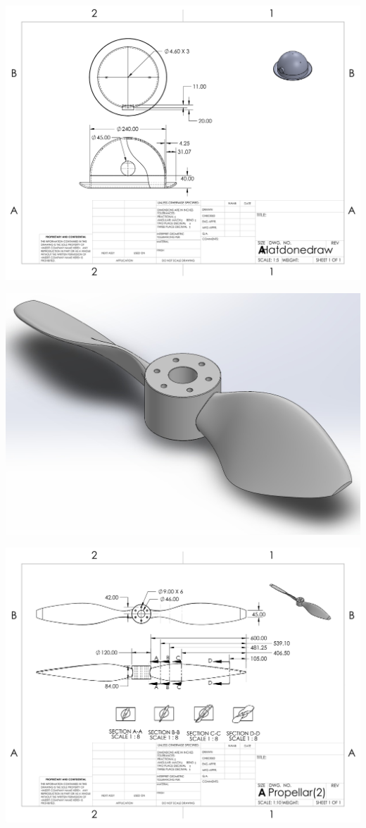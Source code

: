 \centering
\includegraphics[width=\linewidth]{root/Appendix_B/Hat_Body.pdf}

\centering
\includegraphics[width=\linewidth]{root/Models/Propellar_Model.jpg}

\centering
\includegraphics[width=\linewidth]{root/Appendix_B/Propellar.PDF}

